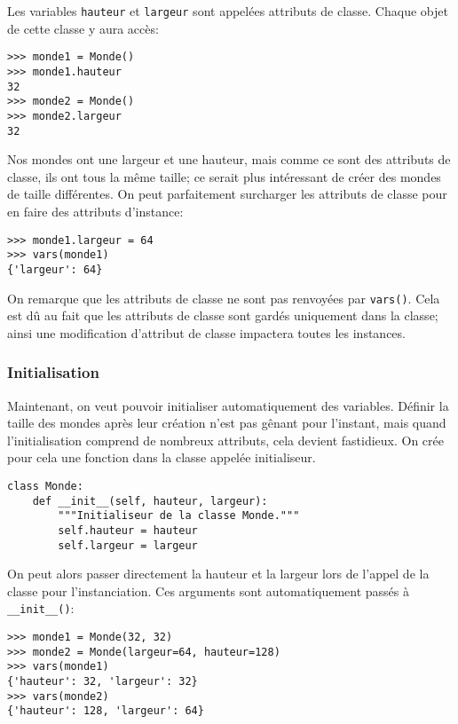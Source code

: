 Les variables \texttt{hauteur} et \texttt{largeur} sont appelées attributs de classe. Chaque objet de cette classe y aura accès:

\begin{verbatim}
>>> monde1 = Monde()
>>> monde1.hauteur
32
>>> monde2 = Monde()
>>> monde2.largeur
32
\end{verbatim}

Nos mondes ont une largeur et une hauteur, mais comme ce sont des attributs de classe, ils ont tous la même taille; ce serait plus intéressant de créer des mondes de taille différentes. On peut parfaitement surcharger les attributs de classe pour en faire des attributs d'instance:

\begin{verbatim}
>>> monde1.largeur = 64
>>> vars(monde1)
{'largeur': 64}
\end{verbatim}

On remarque que les attributs de classe ne sont pas renvoyées par \texttt{vars()}. Cela est dû au fait que les attributs de classe sont gardés uniquement dans la classe; ainsi une modification d'attribut de classe impactera toutes les instances.

\subsubsection{Initialisation}

Maintenant, on veut pouvoir initialiser automatiquement des variables. Définir la taille des mondes après leur création n'est pas gênant pour l'instant, mais quand l'initialisation comprend de nombreux attributs, cela devient fastidieux. On crée pour cela une fonction dans la classe appelée initialiseur.

\begin{verbatim}
class Monde:
    def __init__(self, hauteur, largeur):
        """Initialiseur de la classe Monde."""
        self.hauteur = hauteur
        self.largeur = largeur
\end{verbatim}

On peut alors passer directement la hauteur et la largeur lors de l'appel de la classe pour l'instanciation. Ces arguments sont automatiquement passés à \texttt{__init__()}:

\begin{verbatim}
>>> monde1 = Monde(32, 32)
>>> monde2 = Monde(largeur=64, hauteur=128)
>>> vars(monde1)
{'hauteur': 32, 'largeur': 32}
>>> vars(monde2)
{'hauteur': 128, 'largeur': 64}
\end{verbatim}


